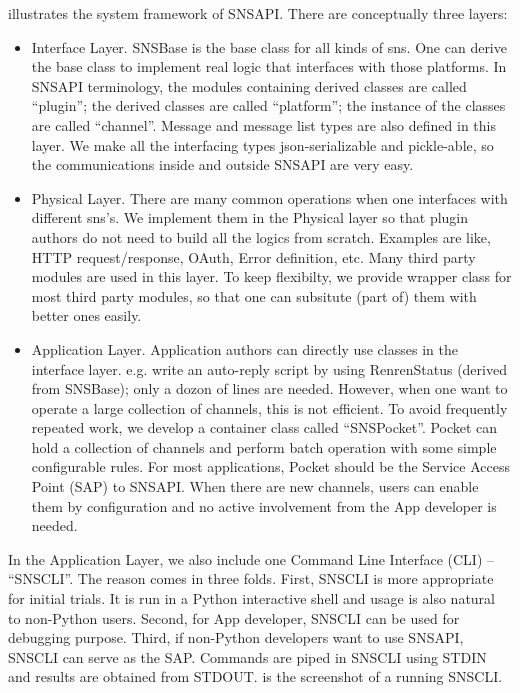 \documentclass{sig-alternate}
\begin{document}
\rfig{\ref{fig:snsapi-arch}} illustrates the system framework of SNSAPI. 
There are conceptually three layers:
\begin{itemize}
	\item Interface Layer. 
		SNSBase is the base class for all kinds of \gls{sns}. 
		One can derive the base class to implement real logic that interfaces with those platforms. 
		In SNSAPI terminology, the modules containing derived classes are called ``plugin'';
		the derived classes are called ``platform''; 
		the instance of the classes are called ``channel''. 
		Message and message list types are also defined in this layer. 
		We make all the interfacing types json-serializable and pickle-able, 
		so the communications inside and outside SNSAPI are very easy. 
	\item Physical Layer. 
		There are many common operations when one interfaces with different \gls{sns}'s. 
		We implement them in the Physical layer so that plugin authors do not need to 
		build all the logics from scratch. 
		Examples are like, HTTP request/response, OAuth, Error definition, etc. 
		Many third party modules are used in this layer. 
		To keep flexibilty, we provide wrapper class for most third party modules, 
		so that one can subsitute (part of) them with better ones easily. 
	\item Application Layer. 
		Application authors can directly use classes in the interface layer. 
		e.g. write an auto-reply script by using RenrenStatus (derived from SNSBase);
		only a dozon of lines are needed. 
		However, when one want to operate a large collection of channels, this is not efficient. 
		To avoid frequently repeated work, we develop a container class called ``SNSPocket''. 
		Pocket can hold a collection of channels and perform batch operation 
		with some simple configurable rules. 
		For most applications, Pocket should be the Service Access Point (SAP) to SNSAPI. 
		When there are new channels, users can enable them by configuration
		and no active involvement from the App developer is needed. 
\end{itemize}

In the Application Layer, we also include one Command Line Interface (CLI) -- ``SNSCLI''. 
The reason comes in three folds. 
First, SNSCLI is more appropriate for initial trials. 
It is run in a Python interactive shell and usage is also natural to non-Python users. 
Second, for App developer, SNSCLI can be used for debugging purpose. 
Third, if non-Python developers want to use SNSAPI, SNSCLI can serve as the SAP. 
Commands are piped in SNSCLI using STDIN and results are obtained from STDOUT. 
\rfig{\ref{fig:snscli}} is the screenshot of a running SNSCLI. 
\end{document}
